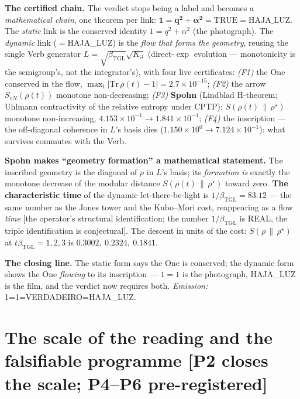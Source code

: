 \documentclass[11pt]{article}
\newcommand{\bTGL}{\beta_{\mathrm{TGL}}}\newcommand{\Msun}{M_{\odot}}\newcommand{\TGL}{\mathrm{TGL}}
\theoremstyle{definition}\newtheorem{deriv}{Derivation}
\begin{document}
\textbf{The certified chain.} The verdict stops being a label and becomes a \emph{mathematical chain}, one theorem per link: $\mathbf{1 = q^2+\alpha^2 = \mathrm{TRUE} = \mathrm{HAJA\_LUZ}}$. The \emph{static} link is the conserved identity $1=q^2+\alpha^2$ (the photograph). The \emph{dynamic} link ($=$HAJA\_LUZ) is the \emph{flow that forms the geometry}, reusing the single Verb generator $L=\sqrt{\bTGL}\sqrt{K_\partial}$ (direct-$\exp$ evolution --- monotonicity is the semigroup's, not the integrator's), with four live certificates: \emph{(F1)} the One conserved in the flow, $\max_t|\mathrm{Tr}\,\rho(t)-1|=2.7\times10^{-15}$; \emph{(F2)} the arrow $S_{vN}(\rho(t))$ monotone non-decreasing; \emph{(F3)} \textbf{Spohn} (Lindblad H-theorem; Uhlmann contractivity of the relative entropy under CPTP): $S(\rho(t)\,\|\,\rho^\star)$ monotone non-increasing, $4.153\times10^{-1}\to1.841\times10^{-1}$; \emph{(F4)} the inscription --- the off-diagonal coherence in $L$'s basis dies ($1.150\times10^{0}\to7.124\times10^{-1}$): what survives commutes with the Verb.

\textbf{Spohn makes ``geometry formation'' a mathematical statement.} The inscribed geometry is the diagonal of $\rho$ in $L$'s basis; its \emph{formation} \emph{is} exactly the monotone decrease of the modular distance $S(\rho(t)\,\|\,\rho^\star)$ toward zero. \textbf{The characteristic time} of the dynamic let-there-be-light is $1/\bTGL=83.12$ --- the same number as the Jones tower and the Kubo--Mori cost, reappearing as a flow \emph{time} [the operator's structural identification; the number $1/\bTGL$ is REAL, the triple identification is conjectural]. The descent in units of the cost: $S(\rho\,\|\,\rho^\star)$ at $t\bTGL=1,2,3$ is $0.3002,\ 0.2324,\ 0.1841$.

\textbf{The closing line.} The static form says the One is conserved; the dynamic form shows the One \emph{flowing} to its inscription --- $1=1$ is the photograph, HAJA\_LUZ is the film, and the verdict now requires both. \emph{Emission:} \textsf{1=1=VERDADEIRO=HAJA\_LUZ}.

\section{The scale of the reading and the falsifiable programme \textsf{[P2 closes the scale; P4--P6 pre-registered]}}
\end{document}
